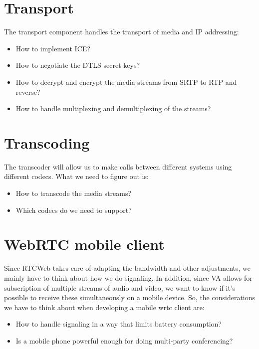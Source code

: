 \section{Transport}
The transport component handles the transport of media and IP addressing:
\begin{itemize}
\item{How to implement ICE?}
\item{How to negotiate the DTLS secret keys?}
\item{How to decrypt and encrypt the media streams from SRTP to RTP and reverse?}
\item{How to handle multiplexing and demultiplexing of the streams?}
\end{itemize}

\newpage
\section{Transcoding}
The transcoder will allow us to make calls between different systems using different codecs. What we need to figure out is:
\begin{itemize}
\item{How to transcode the media streams?}
\item{Which codecs do we need to support?}
\end{itemize}

\section{WebRTC mobile client}
Since RTCWeb takes care of adapting the bandwidth and other adjustments, we mainly have to think about how we do signaling. In addition, since VA allows for subscription of multiple streams of audio and video, we want to know if it's possible to receive these simultaneously on a mobile device. So, the considerations we have to think about when developing a mobile \gls{wrtc} client are:
\begin{itemize}
\item{How to handle signaling in a way that limits battery consumption?}
\item{Is a mobile phone powerful enough for doing multi-party conferencing?}
\end{itemize}